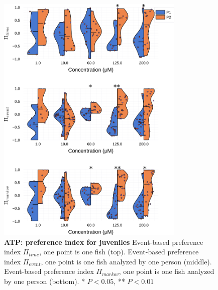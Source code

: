\begin{appendices}
\begin{figure}[h]
      \includegraphics[width=0.8\textwidth]{part_2/assets/dist_atp.png}
      \caption{\textbf{ATP: preference index for juveniles} Event-based preference index $\Pi_{time}$, one point is one fish (top). Event-based preference index $\Pi_{event}$, one point is one fish analyzed by one person (middle). Event-based preference index $\Pi_{markov}$, one point is one fish analyzed by one person (bottom). * $P<0.05$, ** $P<0.01$}
      \label{dist_atp}
    \end{figure}

\end{appendices}
